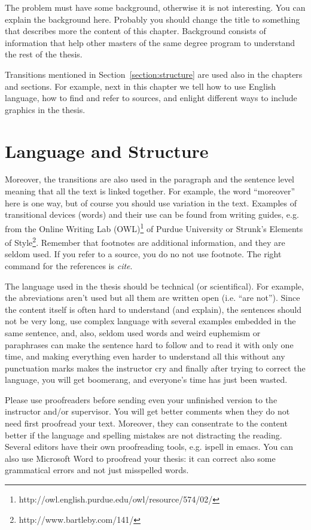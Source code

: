 \documentclass[12pt,a4paper,oneside,pdftex]{report}
\begin{document}
The problem must have some background, otherwise it is not
interesting.  You can explain the background here. Probably you should
change the title to something that describes more the content of this
chapter. Background consists of information that help other masters of
the same degree program to understand the rest of the thesis.

Transitions mentioned in Section~\ref{section:structure} are used also
in the chapters and sections. For example, next in this chapter we
tell how to use English language, how to find and refer to sources,
and enlight different ways to include graphics in the thesis.

\section{Language and Structure}

Moreover, the transitions are also used in the paragraph and the
sentence level meaning that all the text is linked together. For example,
the word ``moreover'' here is one way, but of course you should use
variation in the text. Examples of transitional devices (words) and
their use can be found from writing guides, e.g. from the Online
Writing Lab
(OWL)\footnote{http://owl.english.purdue.edu/owl/resource/574/02/} of
Purdue University or Strunk's Elements of
Style\footnote{http://www.bartleby.com/141/}. Remember that footnotes
are additional information, and they are seldom used.  If you refer to a source, you do no
not use footnote. The right command for the references is \emph{cite}.

The language used in the thesis should be technical (or
scientifical). For example, the abreviations aren't used but all them
are written open (i.e. ``are not''). Since the content itself is often
hard to understand (and explain), the sentences should not be very
long, use complex language with several examples embedded in the same
sentence, and, also, seldom used words and weird euphemism or paraphrases
can make the sentence hard to follow and to read it with only one
time, and making everything even harder to understand all this without
any punctuation marks makes the instructor cry and finally after
trying to correct the language, you will get boomerang, and everyone's
time has just been wasted.

Please use proofreaders before sending even your unfinished version to
the instructor and/or supervisor. You will get better comments when
they do not need first proofread your text. Moreover, they can
consentrate to the content better if the language and spelling
mistakes are not distracting the reading. Several editors have their
own proofreading tools, e.g. ispell in emacs. You can also use
Microsoft Word to proofread your thesis: it can correct also some
grammatical errors and not just misspelled words.
\end{document}
